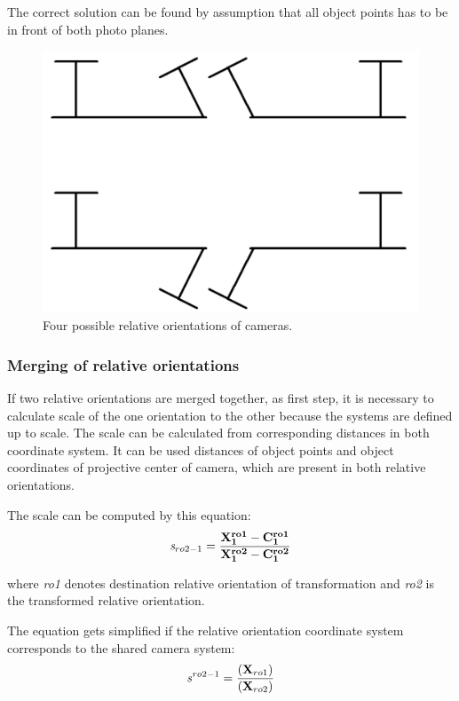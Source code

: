 \documentclass[a4paper,12pt]{article}
\newcommand{\evect}[1]{
{\bf #1}
}
\newcommand{\escal}[1]{
{\it #1}
}
\newcommand{\term}[1]{
{\it #1}
}
\begin{document}
The correct solution can be found   by assumption that all object points has to be in front
of both photo planes.

\begin{figure}[h]
    \centering
    \includegraphics[scale=0.3]{figures/eo_ambiguity.png}
    \caption{Four possible relative orientations of cameras.}
    \label{fig:rel_or_amb}
\end{figure}


\subsubsection{Merging of relative orientations}
\label{sec:ess_chain}

If two relative orientations are merged together, as first step, it is necessary to calculate scale of the one orientation
to the other because the systems are defined up to scale.
The scale can be calculated from corresponding distances in both coordinate system. 
It can be used distances of 
object points and object coordinates of projective center of camera, which are present in both relative orientations.

The scale can be computed by this equation:
\begin{equation}
\escal{s}_{ro2-1} = \frac{\mathbf{\evect{X}^{ro1}_{1} - \evect{C^{ro1}_{1}}}}
	                {\mathbf{\evect{X}^{ro2}_{1} - \evect{C^{ro2}_{1}}}}
\end{equation}

where \term{ro1} denotes destination relative orientation of transformation and \term{ro2} is the transformed relative orientation. 

The equation gets simplified if the relative orientation coordinate system  corresponds to the shared camera system: 
\begin{equation}
\escal{s}^{ro2-1} = \frac{\mathbf(\evect{X}_{ro1})}
	                 {\mathbf(\evect{X}_{ro2})}
\end{equation}
\end{document}
